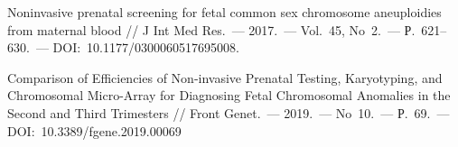 \begin{thebibliography}{99}
\bibitem{} Noninvasive prenatal screening for fetal common sex chromosome aneuploidies from maternal blood // J Int Med Res.~--- 2017.~--- Vol.~45, No~2.~--- Р.~621--630.~--- DOI:~10.1177/0300060517695008.

\bibitem{} Comparison of Efficiencies of Non-invasive Prenatal Testing, Karyotyping, and Chromosomal Micro-Array for Diagnosing Fetal Chromosomal Anomalies in the Second and Third Trimesters // Front Genet.~--- 2019.~--- No~10.~--- Р.~69.~--- DOI:~10.3389/fgene.2019.00069
\end{thebibliography}
\thispagestyle{empty}
